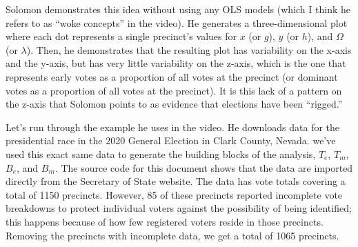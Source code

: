 \documentclass[12pt]{article}
\begin{document}
Solomon demonstrates this idea without using any OLS models (which I think he refers to as ``woke concepts'' in the video). He generates a three-dimensional plot where each dot represents a single precinct's values for \(x\) (or \(g\)), \(y\) (or \(h\)), and \(\Omega\) (or \(\lambda\)). Then, he demonstrates that the resulting plot has variability on the x-axis and the y-axis, but has very little variability on the z-axis, which is the one that represents early votes as a proportion of all votes at the precinct (or dominant votes as a proportion of all votes at the precinct). It is this lack of a pattern on the z-axis that Solomon points to as evidence that elections have been ``rigged.''

Let's run through the example he uses in the video. He downloads data for the presidential race in the 2020 General Election in Clark County, Nevada. we've used this exact same data to generate the building blocks of the analysis, \(T_e\), \(T_m\), \(B_e\), and \(B_m\). The source code for this document shows that the data are imported directly from the Secretary of State website. The data has vote totals covering a total of 1150 precincts. However, 85 of these precincts reported incomplete vote breakdowns to protect individual voters against the possibility of being identified; this happens because of how few registered voters reside in those precincts. Removing the precincts with incomplete data, we get a total of 1065 precincts.

\begin{table}[!htbp] \centering \renewcommand*{\arraystretch}{1.1}\caption{Summary Statistics}
\end{table}
\end{document}
